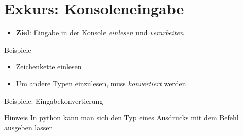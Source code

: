 \section{Exkurs: Konsoleneingabe}
\begin{frame}
    \slidehead

    \begin{itemize}
        \item \textbf{Ziel}: Eingabe in der Konsole \textit{einlesen} und \textit{verarbeiten}
    \end{itemize}

    \begin{block}{Beispiele}
        \begin{itemize}
            \item Zeichenkette einlesen
            \item Um andere Typen einzulesen, muss \textit{konvertiert} werden
        \end{itemize}
    \end{block}
\end{frame}

\begin{frame}
    \slidehead

    Beispiele: Eingabekonvertierung

    \begin{block}{Hinweis}
        In python kann man sich den Typ eines Ausdrucks mit dem Befehl  ausgeben lassen
    \end{block}
\end{frame}

\livecoding



